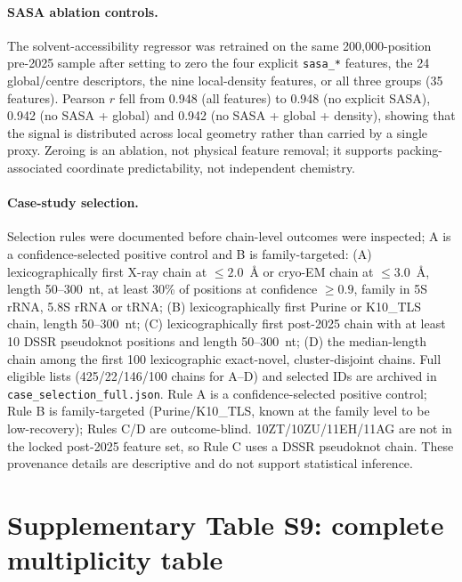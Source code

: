 \documentclass[pdflatex,sn-nature]{sn-jnl}
\begin{document}
\paragraph{SASA ablation controls.} The solvent-accessibility regressor was retrained
on the same 200,000-position pre-2025 sample after setting to zero the four explicit
\texttt{sasa\_*} features, the 24 global/centre descriptors, the nine local-density
features, or all three groups (35 features). Pearson $r$ fell from 0.948 (all features)
to 0.948 (no explicit SASA), 0.942 (no SASA + global) and 0.942 (no SASA + global +
density), showing that the signal is distributed across local geometry rather than carried by a single proxy. Zeroing is an ablation, not physical feature removal; it supports packing-associated coordinate predictability, not independent chemistry.

\paragraph{Case-study selection.} Selection rules were documented before chain-level outcomes were inspected; A is a confidence-selected positive control and B is family-targeted:
(A) lexicographically first X-ray chain at $\leq2.0$~\AA{} or cryo-EM chain at
$\leq3.0$~\AA{}, length 50--300~nt, at least 30\% of positions at confidence $\geq0.9$,
family in 5S rRNA, 5.8S rRNA or tRNA; (B) lexicographically first Purine or K10\_TLS
chain, length 50--300~nt; (C) lexicographically first post-2025 chain with at least 10
DSSR pseudoknot positions and length 50--300~nt; (D) the median-length chain among the
first 100 lexicographic exact-novel, cluster-disjoint chains. Full eligible lists (425/22/146/100 chains for A--D) and selected IDs are archived in \texttt{case\_selection\_full.json}. Rule A is a confidence-selected positive control; Rule B is family-targeted (Purine/K10\_TLS, known at the family level to be low-recovery); Rules C/D are outcome-blind. 10ZT/10ZU/11EH/11AG are not in the locked post-2025 feature set, so Rule C uses a DSSR pseudoknot chain. These provenance details are descriptive and do not support statistical inference.



\section*{Supplementary Table S9: complete multiplicity table}
\end{document}
